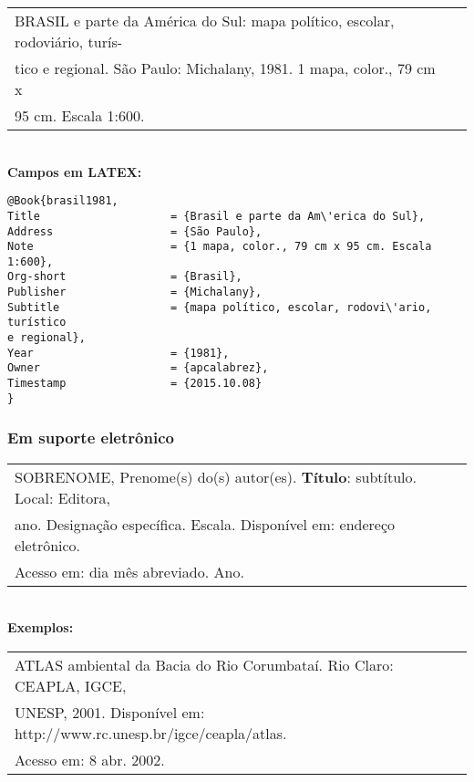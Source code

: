 \begin{tabular}{|l|c|} \hline
	BRASIL e parte da Am\'erica do Sul: mapa político, escolar, rodovi\'ario,
	turís-\\ 
	tico e regional. São Paulo: Michalany, 1981. 1 mapa, color., 79 cm x\\
	95 cm. Escala 1:600. 
	\\\hline
\end{tabular} \\

\textbf{Campos em LATEX:} 

\begin{verbatim}
@Book{brasil1981,
Title                    = {Brasil e parte da Am\'erica do Sul},
Address                  = {São Paulo},
Note                     = {1 mapa, color., 79 cm x 95 cm. Escala 1:600},
Org-short                = {Brasil},
Publisher                = {Michalany},
Subtitle                 = {mapa político, escolar, rodovi\'ario, turístico 
e regional},
Year                     = {1981},
Owner                    = {apcalabrez},
Timestamp                = {2015.10.08}
}
\end{verbatim}

\subsubsection{Em suporte eletrônico}

\begin{tabular}{|l|c|} \hline
	SOBRENOME, Prenome(s) do(s) autor(es). \textbf{Título}: subtítulo. Local: Editora,\\
	ano. Designação específica. Escala. Disponível em: endereço eletrônico. \\
	Acesso em: dia m\^es abreviado. Ano. 
	\\\hline
\end{tabular} \\

\textbf{Exemplos:} \\

\begin{tabular}{|l|c|} \hline
	ATLAS ambiental da Bacia do Rio Corumbataí. Rio Claro: CEAPLA, IGCE,\\
	UNESP, 2001. Disponível em: http://www.rc.unesp.br/igce/ceapla/atlas.\\
	Acesso em: 8 abr. 2002. 
	\\\hline
\end{tabular} \\

